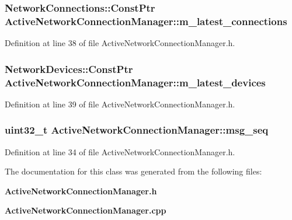 \subsubsection[{m\-\_\-latest\-\_\-connections}]{\setlength{\rightskip}{0pt plus 5cm}\-Network\-Connections\-::\-Const\-Ptr {\bf \-Active\-Network\-Connection\-Manager\-::m\-\_\-latest\-\_\-connections}\hspace{0.3cm}{\ttfamily  [private]}}\label{classActiveNetworkConnectionManager_a07c47fc80d7aefcbd090653bbe84791c}


\-Definition at line 38 of file \-Active\-Network\-Connection\-Manager.\-h.

\subsubsection[{m\-\_\-latest\-\_\-devices}]{\setlength{\rightskip}{0pt plus 5cm}\-Network\-Devices\-::\-Const\-Ptr {\bf \-Active\-Network\-Connection\-Manager\-::m\-\_\-latest\-\_\-devices}\hspace{0.3cm}{\ttfamily  [private]}}\label{classActiveNetworkConnectionManager_af5050daf76e9310dcaf30999e841cdf8}


\-Definition at line 39 of file \-Active\-Network\-Connection\-Manager.\-h.

\subsubsection[{msg\-\_\-seq}]{\setlength{\rightskip}{0pt plus 5cm}uint32\-\_\-t {\bf \-Active\-Network\-Connection\-Manager\-::msg\-\_\-seq}\hspace{0.3cm}{\ttfamily  [private]}}\label{classActiveNetworkConnectionManager_a23662bc8ff3a40a0c99b2fe67c50a213}


\-Definition at line 34 of file \-Active\-Network\-Connection\-Manager.\-h.



\-The documentation for this class was generated from the following files\-:\begin{DoxyCompactItemize}
\item 
{\bf \-Active\-Network\-Connection\-Manager.\-h}\item 
{\bf \-Active\-Network\-Connection\-Manager.\-cpp}\end{DoxyCompactItemize}
